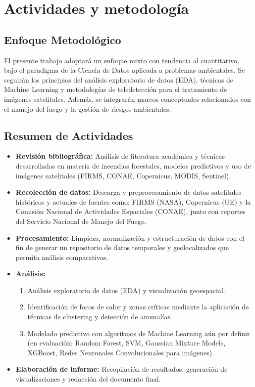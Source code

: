 \section{Actividades y metodología}
\subsection{Enfoque Metodológico}
El presente trabajo adoptará un enfoque mixto con tendencia al cuantitativo, bajo el paradigma de la Ciencia de Datos aplicada a problemas ambientales. Se seguirán los principios del análisis exploratorio de datos (EDA), técnicas de Machine Learning y metodologías de teledetección para el tratamiento de imágenes satelitales. Además, se integrarán marcos conceptuales relacionados con el manejo del fuego y la gestión de riesgos ambientales.
\subsection{Resumen de Actividades}
\begin{itemize}
    \item \textbf{Revisión bibliográfica:} Análisis de literatura académica y técnicas desarrolladas en materia de incendios forestales, modelos predictivos y uso de imágenes satelitales (FIRMS, CONAE, Copernicus, MODIS, Sentinel). \\ 
    \item \textbf{Recolección de datos:} Descarga y preprocesamiento de datos satelitales históricos y actuales de fuentes como: FIRMS (NASA), Copernicus (UE) y la Comisión Nacional de Actividades Espaciales (CONAE), junto con reportes del Servicio Nacional de Manejo del Fuego. \\
    \item \textbf{Procesamiento:} Limpieza, normalización y estructuración de datos con el fin de generar un repositorio de datos temporales y geolocalizados que permita análisis comparativos. \\
    \item \textbf{Análisis:} 
        \begin{enumerate}
            \item Análisis exploratorio de datos (EDA) y visualización geoespacial.  
            \item Identificación de focos de calor y zonas críticas mediante la aplicación de técnicas de clustering y detección de anomalías.  
            \item Modelado predictivo con algoritmos de Machine Learning aún por definir (en evaluación: Random Forest, SVM, Gaussian Mixture Models, XGBoost, Redes Neuronales Convolucionales para imágenes).  \\
        \end{enumerate}
    \item \textbf{Elaboración de informe:} Recopilación de resultados, generación de visualizaciones y redacción del documento final.  
\end{itemize}